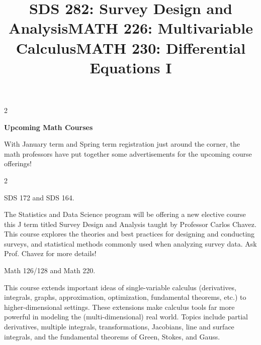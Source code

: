 \documentclass[12pt]{article}
\newcommand{\bolder}{\textbf}
\begin{document}
\begin{multicols}{2}
\end{multicols} \vspace{0.5cm}

\begin{center}
    {\Large \textbf{Upcoming Math Courses}}
\end{center}

With January term and Spring term registration just around the corner, the math professors have put together some advertisements for the upcoming course offerings!

\begin{multicols}{2}
\begin{tcolorbox}[colback=white, colframe=black]
    \begin{center}
    \title{{\large \bolder{SDS 282: Survey Design and Analysis}}}
    \end{center}
\end{tcolorbox}

 SDS 172 and SDS 164. 

The Statistics and Data Science program will be offering a new elective course this J term titled Survey Design and Analysis taught by Professor Carlos Chavez. This course explores the theories and best practices for designing and conducting surveys, and statistical methods commonly used when analyzing survey data. Ask Prof. Chavez for more details!  

\begin{tcolorbox}[colback=white, colframe=black]
    \begin{center}
    \title{{\large \bolder{MATH 226: Multivariable Calculus}}}
    \end{center}
\end{tcolorbox}

 Math 126/128 and Math 220.

This course extends important ideas of single-variable calculus (derivatives, integrals, graphs, approximation, optimization, fundamental theorems, etc.) to higher-dimensional settings. These extensions make calculus tools far more powerful in modeling the (multi-dimensional) real world. Topics include partial derivatives, multiple integrals, transformations, Jacobians, line and surface integrals, and the fundamental theorems of Green, Stokes, and Gauss.


\begin{tcolorbox}[colback=white, colframe=black]
    \begin{center}
    \title{{\large \bolder{MATH 230: Differential Equations I}}}
    \end{center}
\end{tcolorbox}


\end{multicols}
\end{document}
